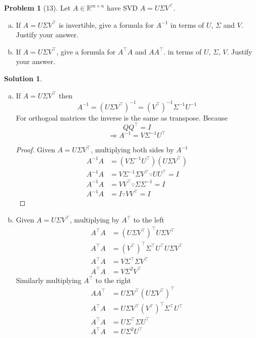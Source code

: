 \documentclass{amsart}[11pt]
\theoremstyle{definition}
\newtheorem*{problem}{Problem}
\newtheorem*{solution}{Solution}
\newcommand{\R}{\mathbb{R}}
\begin{document}
\begin{problem}[13]
Let $A\in\R^{m\times n}$ have SVD $A=U\Sigma V^\top$.
\begin{enumerate}[(a)]
\item If $A=U\Sigma V^\top$ is invertible, give a formula for $A^{-1}$ in terms of $U$, $\Sigma$ and $V$. Justify your answer.
\item If $A=U\Sigma V^\top$, give a formula for $A^\top A$ and $AA^\top$. in terms of $U$, $\Sigma$, $V$. Justify your answer.
\end{enumerate}
\begin{solution}
    \begin{enumerate}[(a)]
        \item If $A=U\Sigma V^\top$ then
        \[A^{-1}=(U\Sigma V^\top)^{-1}=(V^\top)^{-1}\Sigma^{-1}U^{-1}\]
        For orthogoal matrices the inverse is the same as transpose. Because
        \[QQ^\top=I \]
        \[\Rightarrow A^{-1}=V\Sigma^{-1}U^{\top}\]
        \begin{proof}
            Given $A=U\Sigma V^\top$, multiplying both sides by $A^{-1}$
            \begin{align*}
                A^{-1}A &= (V\Sigma^{-1}U^{\top})(U\Sigma V^\top) \\
                A^{-1}A &= V\Sigma^{-1}\Sigma V^\top \because UU^\top=I \\
                A^{-1}A &= VV^\top \because \Sigma\Sigma^{-1}=I \\
                A^{-1}A &= I \because VV^\top=I
            \end{align*}
        \end{proof}
        \item Given $A=U\Sigma V^\top$, multiplying by $A^\top$ to the left
        \begin{align*}
            A^\top A&=(U\Sigma V^\top)^\top U\Sigma V^\top \\
            A^\top A&=(V^\top)^\top\Sigma^\top U^\top U\Sigma V^\top \\
            A^\top A&=V\Sigma^\top\Sigma V^\top \\
            A^\top A&=V\Sigma^2 V^\top
        \end{align*}
        Similarly multiplying $A^\top$ to the right
        \begin{align*}
            AA^\top &= U\Sigma V^\top (U\Sigma V^\top)^\top\\
            A^\top A&= U\Sigma V^\top (V^\top)^\top\Sigma^\top U^\top\\
            A^\top A&=U\Sigma^\top\Sigma U^\top \\
            A^\top A&=U\Sigma^2 U^\top
        \end{align*}
    \end{enumerate}
\end{solution}
\end{problem}
\end{document}
